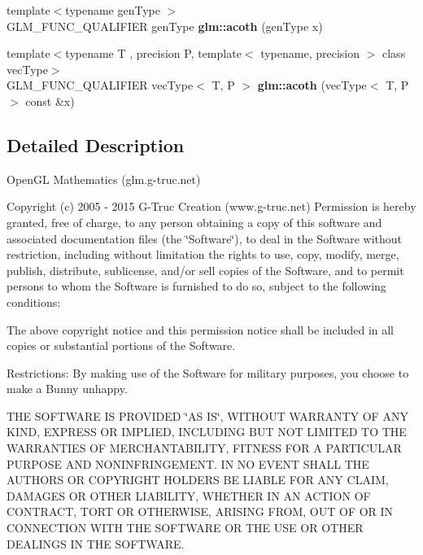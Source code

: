 \begin{DoxyCompactItemize}
\item 
\hypertarget{namespaceglm_ae3076334d7333af3a8ebe33bff68f53f}{{\footnotesize template$<$typename gen\-Type $>$ }\\G\-L\-M\-\_\-\-F\-U\-N\-C\-\_\-\-Q\-U\-A\-L\-I\-F\-I\-E\-R gen\-Type {\bfseries glm\-::acoth} (gen\-Type x)}\label{namespaceglm_ae3076334d7333af3a8ebe33bff68f53f}

\item 
\hypertarget{namespaceglm_a51bfb25efbc539ee80486ea96690359a}{{\footnotesize template$<$typename T , precision P, template$<$ typename, precision $>$ class vec\-Type$>$ }\\G\-L\-M\-\_\-\-F\-U\-N\-C\-\_\-\-Q\-U\-A\-L\-I\-F\-I\-E\-R vec\-Type$<$ T, P $>$ {\bfseries glm\-::acoth} (vec\-Type$<$ T, P $>$ const \&x)}\label{namespaceglm_a51bfb25efbc539ee80486ea96690359a}

\end{DoxyCompactItemize}


\subsection{Detailed Description}
Open\-G\-L Mathematics (glm.\-g-\/truc.\-net)

Copyright (c) 2005 -\/ 2015 G-\/\-Truc Creation (www.\-g-\/truc.\-net) Permission is hereby granted, free of charge, to any person obtaining a copy of this software and associated documentation files (the \char`\"{}\-Software\char`\"{}), to deal in the Software without restriction, including without limitation the rights to use, copy, modify, merge, publish, distribute, sublicense, and/or sell copies of the Software, and to permit persons to whom the Software is furnished to do so, subject to the following conditions\-:

The above copyright notice and this permission notice shall be included in all copies or substantial portions of the Software.

Restrictions\-: By making use of the Software for military purposes, you choose to make a Bunny unhappy.

T\-H\-E S\-O\-F\-T\-W\-A\-R\-E I\-S P\-R\-O\-V\-I\-D\-E\-D \char`\"{}\-A\-S I\-S\char`\"{}, W\-I\-T\-H\-O\-U\-T W\-A\-R\-R\-A\-N\-T\-Y O\-F A\-N\-Y K\-I\-N\-D, E\-X\-P\-R\-E\-S\-S O\-R I\-M\-P\-L\-I\-E\-D, I\-N\-C\-L\-U\-D\-I\-N\-G B\-U\-T N\-O\-T L\-I\-M\-I\-T\-E\-D T\-O T\-H\-E W\-A\-R\-R\-A\-N\-T\-I\-E\-S O\-F M\-E\-R\-C\-H\-A\-N\-T\-A\-B\-I\-L\-I\-T\-Y, F\-I\-T\-N\-E\-S\-S F\-O\-R A P\-A\-R\-T\-I\-C\-U\-L\-A\-R P\-U\-R\-P\-O\-S\-E A\-N\-D N\-O\-N\-I\-N\-F\-R\-I\-N\-G\-E\-M\-E\-N\-T. I\-N N\-O E\-V\-E\-N\-T S\-H\-A\-L\-L T\-H\-E A\-U\-T\-H\-O\-R\-S O\-R C\-O\-P\-Y\-R\-I\-G\-H\-T H\-O\-L\-D\-E\-R\-S B\-E L\-I\-A\-B\-L\-E F\-O\-R A\-N\-Y C\-L\-A\-I\-M, D\-A\-M\-A\-G\-E\-S O\-R O\-T\-H\-E\-R L\-I\-A\-B\-I\-L\-I\-T\-Y, W\-H\-E\-T\-H\-E\-R I\-N A\-N A\-C\-T\-I\-O\-N O\-F C\-O\-N\-T\-R\-A\-C\-T, T\-O\-R\-T O\-R O\-T\-H\-E\-R\-W\-I\-S\-E, A\-R\-I\-S\-I\-N\-G F\-R\-O\-M, O\-U\-T O\-F O\-R I\-N C\-O\-N\-N\-E\-C\-T\-I\-O\-N W\-I\-T\-H T\-H\-E S\-O\-F\-T\-W\-A\-R\-E O\-R T\-H\-E U\-S\-E O\-R O\-T\-H\-E\-R D\-E\-A\-L\-I\-N\-G\-S I\-N T\-H\-E S\-O\-F\-T\-W\-A\-R\-E.

